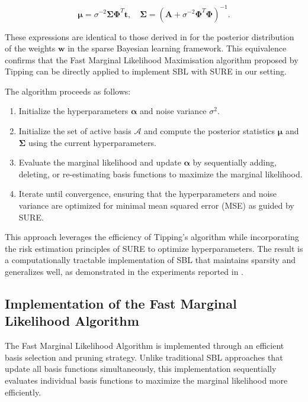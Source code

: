 \documentclass{article}
\begin{document}
\begin{equation}
    \boldsymbol{\mu} = \sigma^{-2}\boldsymbol{\Sigma}\boldsymbol{\Phi}^T\mathbf{t}, \quad \boldsymbol{\Sigma} = \left(\mathbf{A} + \sigma^{-2}\boldsymbol{\Phi}^T\boldsymbol{\Phi}\right)^{-1}.
\end{equation}

These expressions are identical to those derived in \cite{tipp2003fastsb} for the posterior distribution of the weights $\mathbf{w}$ in the sparse Bayesian learning framework. This equivalence confirms that the Fast Marginal Likelihood Maximisation algorithm proposed by Tipping can be directly applied to implement SBL with SURE in our setting.

The algorithm proceeds as follows:
\begin{enumerate}
    \item Initialize the hyperparameters $\boldsymbol{\alpha}$ and noise variance $\sigma^2$.
    \item Initialize the set of active basis $\mathcal{A}$ and compute the posterior statistics $\boldsymbol{\mu}$ and $\boldsymbol{\Sigma}$ using the current hyperparameters.
    \item Evaluate the marginal likelihood and update $\boldsymbol{\alpha}$ by sequentially adding, deleting, or re-estimating basis functions to maximize the marginal likelihood.
    \item Iterate until convergence, ensuring that the hyperparameters and noise variance are optimized for minimal mean squared error (MSE) as guided by SURE.
\end{enumerate}

This approach leverages the efficiency of Tipping's algorithm while incorporating the risk estimation principles of SURE to optimize hyperparameters. The result is a computationally tractable implementation of SBL that maintains sparsity and generalizes well, as demonstrated in the experiments reported in \cite{tipp2003fastsb}.

\subsection{Implementation of the Fast Marginal Likelihood Algorithm}

The Fast Marginal Likelihood Algorithm is implemented through an efficient basis selection and pruning strategy. Unlike traditional SBL approaches that update all basis functions simultaneously, this implementation sequentially evaluates individual basis functions to maximize the marginal likelihood more efficiently.
\end{document}
